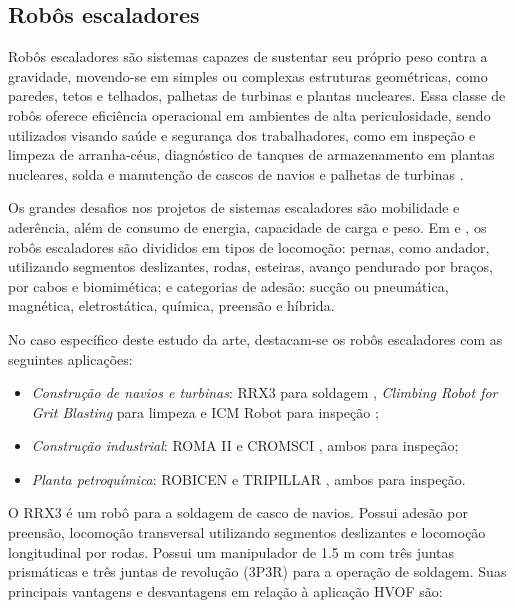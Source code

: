 \subsection{Robôs escaladores}
Robôs escaladores são sistemas capazes de sustentar seu próprio peso contra a
gravidade, movendo-se em simples ou complexas estruturas geométricas, como
paredes, tetos e telhados, palhetas de turbinas e plantas nucleares.
Essa classe de robôs oferece eficiência operacional em ambientes
de alta periculosidade, sendo utilizados visando saúde e segurança dos
trabalhadores, como em inspeção e limpeza de arranha-céus, diagnóstico de
tanques de armazenamento em plantas nucleares, solda e manutenção de cascos de
navios e palhetas de turbinas \cite{clawar}.

Os grandes desafios nos projetos de sistemas escaladores são mobilidade e
aderência, além de consumo de energia, capacidade de carga e peso. Em
\cite{modular}e \cite{climbsurv}, os robôs escaladores são divididos em tipos de locomoção:
pernas, como andador, utilizando segmentos deslizantes, rodas, esteiras, avanço
pendurado por braços, por cabos e biomimética; e categorias de adesão: sucção ou
pneumática, magnética, eletrostática, química, preensão e híbrida.

No caso específico deste estudo da arte, destacam-se os robôs escaladores com as
seguintes aplicações:

\begin{itemize}
  \item \emph{Construção de navios e turbinas}: RRX3 para soldagem
  \citep{rrx3}, \emph{Climbing Robot for Grit Blasting} para limpeza
  \citep{crgb} e ICM Robot para inspeção \citep{icm};
  \item \emph{Construção industrial}: ROMA II \citep{roma} e
  CROMSCI \citep{CROMSCI}, ambos para inspeção; 
 \item \emph{Planta petroquímica}: ROBICEN \citep{robicen} e
  TRIPILLAR \citep{tripillar}, ambos para inspeção.  
\end{itemize}

O RRX3 é um robô para a soldagem de casco de navios. Possui adesão por
preensão, locomoção transversal utilizando segmentos deslizantes e locomoção
longitudinal por rodas. Possui um manipulador de 1.5 m com três juntas
prismáticas e três juntas de revolução (3P3R) para a operação de soldagem. Suas
principais vantagens e desvantagens em relação à aplicação HVOF são:

